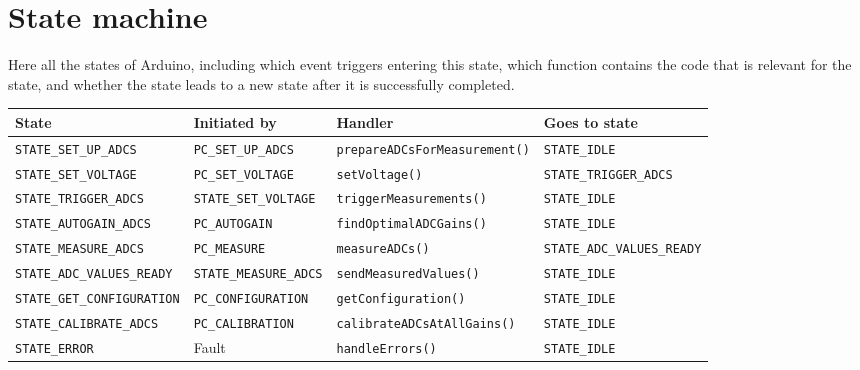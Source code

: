 \documentclass[11pt,a4paper,english]{article}
\begin{document}
\clearpage

\section{State machine}\label{sec:state_machine}
Here all the states of Arduino, including which event triggers entering this state, which function contains the code that is relevant for the state, and whether the state leads to a new state after it is successfully completed.
\begin{center}
\small
\begin{tabular}{llll}\toprule
State					        & Initiated by                 & Handler                            & Goes to state        \\\midrule
\texttt{STATE\_SET\_UP\_ADCS}   & \texttt{PC\_SET\_UP\_ADCS}   & \texttt{prepareADCsForMeasurement()} & \texttt{STATE\_IDLE} \\
\texttt{STATE\_SET\_VOLTAGE}    & \texttt{PC\_SET\_VOLTAGE}    & \texttt{setVoltage()}              & \texttt{STATE\_TRIGGER\_ADCS}\\
\texttt{STATE\_TRIGGER\_ADCS}   & \texttt{STATE\_SET\_VOLTAGE} & \texttt{triggerMeasurements()}     & \texttt{STATE\_IDLE} \\
\texttt{STATE\_AUTOGAIN\_ADCS}  & \texttt{PC\_AUTOGAIN}        & \texttt{findOptimalADCGains()}     & \texttt{STATE\_IDLE} \\
\texttt{STATE\_MEASURE\_ADCS}   & \texttt{PC\_MEASURE} 		   & \texttt{measureADCs()}   & \texttt{STATE\_ADC\_VALUES\_READY}\\
\texttt{STATE\_ADC\_VALUES\_READY} & \texttt{STATE\_MEASURE\_ADCS} & \texttt{sendMeasuredValues()}  & \texttt{STATE\_IDLE}\\
\texttt{STATE\_GET\_CONFIGURATION} & \texttt{PC\_CONFIGURATION}    & \texttt{getConfiguration()}    & \texttt{STATE\_IDLE}\\
\texttt{STATE\_CALIBRATE\_ADCS} & \texttt{PC\_CALIBRATION}     & \texttt{calibrateADCsAtAllGains()} & \texttt{STATE\_IDLE}\\
\texttt{STATE\_ERROR}           & Fault                        & \texttt{handleErrors()}            & \texttt{STATE\_IDLE}\\
\bottomrule
\end{tabular}
\end{center}
\end{document}
